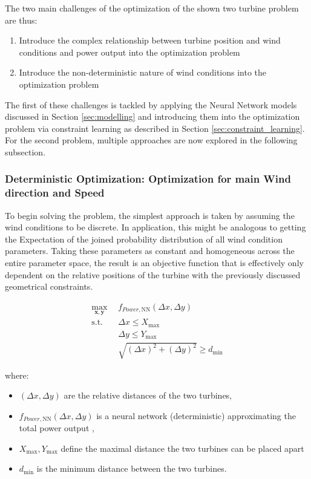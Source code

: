 The two main challenges of the optimization of the shown two turbine problem are thus: 

\begin{enumerate}
	\item Introduce the complex relationship between turbine position and wind conditions and power output into the optimization problem
	\item Introduce the non-deterministic nature of wind conditions into the optimization problem
\end{enumerate}

The first of these challenges is tackled by applying the Neural Network models discussed in Section \ref{sec:modelling} and introducing them into the optimization problem via constraint learning as described in Section \ref{sec:constraint_learning}. For the second problem, multiple approaches are now explored in the following subsection.


\subsubsection{Deterministic Optimization: Optimization for main Wind direction and Speed}

To begin solving the problem, the simplest approach is taken by assuming the wind conditions to be discrete. In application, this might be analogous to getting the Expectation of the joined probability distribution of all wind condition parameters. Taking these parameters as constant and homogeneous across the entire parameter space, the result is an objective function that is effectively only dependent on the relative positions of the turbine with the previously discussed geometrical constraints.

\begin{align}
	\max_{\mathbf{x}, \mathbf{y}} & f_{Power,\text{NN}}(\Delta x, \Delta y) \\
	\text{s.t.} \quad 
	&  \Delta x \leq X_{\max} \\
	&  \Delta y \leq Y_{\max} \\
	& \sqrt{(\Delta x)^2 + (\Delta y)^2} \geq d_{\min}
\end{align}

where:
\begin{itemize}
	\item \( (\Delta x, \Delta y) \) are the relative distances of the two turbines,
	\item \( f_{Power, \text{NN}}(\Delta x, \Delta y)\) is a neural network (deterministic) approximating the total power output ,
	\item \(  X_{\max}, Y_{\max} \) define the maximal distance the two turbines can be placed apart
	\item \( d_{\min} \) is the minimum distance between the two turbines.
\end{itemize}


